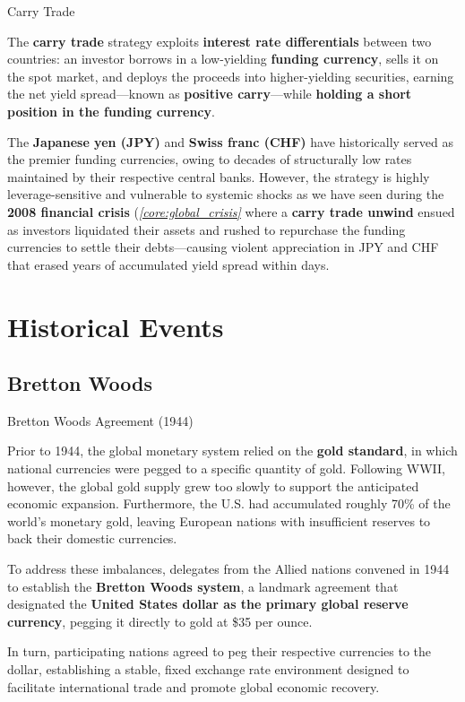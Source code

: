 \documentclass[10pt]{article}
\begin{document}
  \begin{core}[label=core:carry_trade_mech]{Carry Trade}

    The \textbf{carry trade} strategy exploits \textbf{interest rate differentials} between two countries: an investor borrows in a low-yielding \textbf{funding currency}, sells it on the spot market, and deploys the proceeds into higher-yielding securities, earning the net yield spread---known as \textbf{positive carry}---while \textbf{holding a short position in the funding currency}.

    The \textbf{Japanese yen (JPY)} and \textbf{Swiss franc (CHF)} have historically served as the premier funding currencies, owing to decades of structurally low rates maintained by their respective central banks. However, the strategy is highly leverage-sensitive and vulnerable to systemic shocks as we have seen during the \textbf{2008 financial crisis} (\textit{\autoref{core:global_crisis}} where a \textbf{carry trade unwind} ensued as investors liquidated their assets and rushed to repurchase the funding currencies to settle their debts---causing violent appreciation in JPY and CHF that erased years of accumulated yield spread within days.

  \end{core}

\section{Historical Events}
  \label{sec:history}

  \subsection{Bretton Woods}

    \begin{core}{Bretton Woods Agreement (1944)}

      Prior to 1944, the global monetary system relied on the \textbf{gold standard}, in which national currencies were pegged to a specific quantity of gold. Following WWII, however, the global gold supply grew too slowly to support the anticipated economic expansion. Furthermore, the U.S. had accumulated roughly 70\% of the world's monetary gold, leaving European nations with insufficient reserves to back their domestic currencies.

      To address these imbalances, delegates from the Allied nations convened in 1944 to establish the \textbf{Bretton Woods system}, a landmark agreement that designated the \textbf{United States dollar as the primary global reserve currency}, pegging it directly to gold at \$35 per ounce.


      In turn, participating nations agreed to peg their respective currencies to the dollar, establishing a stable, fixed exchange rate environment designed to facilitate international trade and promote global economic recovery.

    \end{core}
\end{document}
